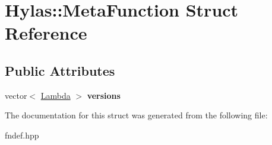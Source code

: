 \hypertarget{structHylas_1_1MetaFunction}{
\section{Hylas::MetaFunction Struct Reference}
\label{structHylas_1_1MetaFunction}
}
\subsection*{Public Attributes}
\begin{DoxyCompactItemize}
\item 
\hypertarget{structHylas_1_1MetaFunction_ac7edbc968d651f86d5b140ccbd47f18d}{
vector$<$ \hyperlink{structHylas_1_1Lambda}{Lambda} $>$ {\bfseries versions}}
\label{structHylas_1_1MetaFunction_ac7edbc968d651f86d5b140ccbd47f18d}

\end{DoxyCompactItemize}


The documentation for this struct was generated from the following file:\begin{DoxyCompactItemize}
\item 
fndef.hpp\end{DoxyCompactItemize}
